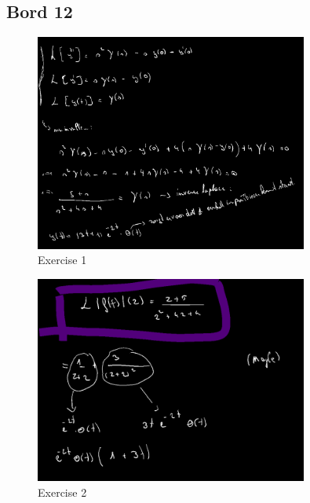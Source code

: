 \documentclass[a4paper]{report}
\begin{document}
\subsection*{Bord 12}

\begin{figure}[H]
	\centering
	\includegraphics[width=0.8\textwidth]{assets/bord_12_ex_1.png}
	\caption{Exercise 1}
	\label{fig:bord_12_ex_1}
\end{figure}

\begin{figure}[H]
	\centering
	\includegraphics[width=0.8\textwidth]{assets/bord_12_ex_2.png}
	\caption{Exercise 2}
	\label{fig:bord_12_ex_2}
\end{figure}


\end{document}

